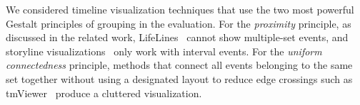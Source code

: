 %
%
%


We considered timeline visualization techniques that use the two most powerful Gestalt principles of grouping in the evaluation. For the \emph{proximity} principle, as discussed in the related work, LifeLines~\cite{Plaisant1996a} cannot show multiple-set events, and storyline visualizations~\cite{Liu2013} only work with interval events. For the \emph{uniform connectedness} principle, methods that connect all events belonging to the same set together without using a designated layout to reduce edge crossings such as tmViewer~\cite{Kumar1998} produce a cluttered visualization. 

\label{sub:lr-timeset}